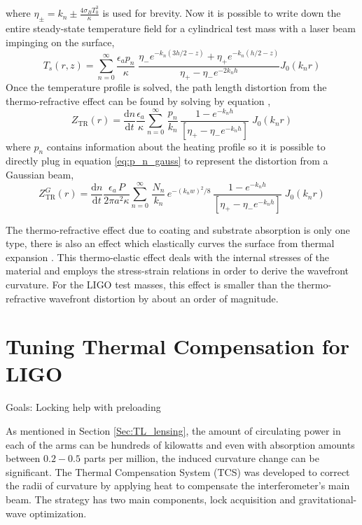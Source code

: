 	where $\eta_{\pm} = k_n \pm \frac{4\sigma_B T_0^3}{\kappa}$ is used for brevity. Now it is possible to write down the entire steady-state temperature field for a cylindrical test mass with a laser beam impinging on the surface,
	\begin{equation}
	T_s(r,z) = \sum_{n=0}^{\infty} \frac{\epsilon_a p_n}{\kappa}  \; \frac{ \eta_{-}e^{-k_n(3h/2-z)} + \eta_{+}e^{-k_n(h/2-z)}  }{\eta_{+} - \eta_{-} e^{-2k_n h} } J_0(k_n r)
	\end{equation} 
	Once the temperature profile is solved, the path length distortion from the thermo-refractive effect can be found by solving by equation \label{eq:thermoref},
	\begin{equation}
	Z_{\text{TR}}(r) = \frac{\text{d}n}{\text{d}t} \frac{\epsilon_a}{\kappa} \sum_{n=0}^{\infty} \, \frac{p_n}{k_n} \, \frac{1- e^{-k_n h}}{[\eta_{+} - \eta_{-} e^{-k_nh}]} \; J_0(k_n r) 
	\end{equation}
	where $p_n$ contains information about the heating profile so it is possible to directly plug in equation \ref{eq:p_n_gauss} to represent the distortion from a Gaussian beam,
	\begin{equation}
	Z_{\text{TR}}^{G}(r) =  \frac{\text{d}n}{\text{d}t} \frac{\epsilon_a \, P}{2\pi a^2 \kappa} \sum_{n=0}^{\infty} \, \frac{N_n}{k_n}\, e^{-(k_n w)^2/8} \, \frac{1- e^{-k_n h}}{[\eta_{+} - \eta_{-} e^{-k_nh}]} \; J_0(k_n r) 
	\end{equation}

	The thermo-refractive effect due to coating and substrate absorption is only one type, there is also an effect which elastically curves the surface from thermal expansion \cite{Vinet_Thermal_Issues}.  This thermo-elastic effect deals with the internal stresses of the material and employs the stress-strain relations in order to derive the wavefront curvature.  For the LIGO test masses, this effect is smaller than the thermo-refractive wavefront distortion by about an order of magnitude.
	\section{Tuning Thermal Compensation for LIGO}
	Goals: Locking help with preloading
	
	\cite{Lawrence_TCS}
	
	\cite{AWC_current}
	
	\cite{winkler_thermaldist}
	
	\cite{Strain_TL}
	As mentioned in Section \ref{Sec:TL_lensing}, the amount of circulating power in each of the arms can be hundreds of kilowatts and even with absorption amounts between $0.2-0.5$ parts per million, the induced curvature change can be significant.  The Thermal Compensation System (TCS) was developed to correct the radii of curvature by applying heat to compensate the interferometer's main beam.  The strategy has two main components, lock acquisition and gravitational-wave optimization.
	
